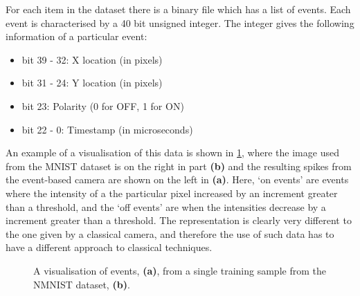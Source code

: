 For each item in the dataset there is a binary file which has a list of events. Each event is characterised by a 40 bit unsigned integer. The integer gives the following information of a particular event:

\begin{itemize}
      \item bit 39 - 32: X location (in pixels)
      \item bit 31 - 24: Y location (in pixels)
      \item bit 23: Polarity (0 for OFF, 1 for ON)
      \item bit 22 - 0: Timestamp (in microseconds)
\end{itemize}

An example of a visualisation of this data is shown in \cref{fig:nmnist_spikes_visualisation}, where the image used from the MNIST dataset is on the right in part \textbf{(b)} and the resulting spikes from the event-based camera are shown on the left in \textbf{(a)}. Here, `on events' are events where the intensity of a the particular pixel increased by an increment greater than a threshold, and the `off events' are when the intensities decrease by a increment greater than a threshold. The representation is clearly very different to the one given by a classical camera, and therefore the use of such data has to have a different approach to classical techniques.

\begin{figure}[htb]%
      \centering
      \qquad
      \caption{A visualisation of events, \textbf{(a)}, from a single training sample from the NMNIST dataset, \textbf{(b)}.}%
      \label{fig:nmnist_spikes_visualisation}%
\end{figure}


